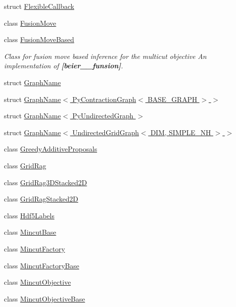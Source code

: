 \begin{DoxyCompactItemize}
\item 
struct \hyperlink{structnifty_1_1graph_1_1FlexibleCallback}{Flexible\+Callback}
\item 
class \hyperlink{classnifty_1_1graph_1_1FusionMove}{Fusion\+Move}
\item 
class \hyperlink{classnifty_1_1graph_1_1FusionMoveBased}{Fusion\+Move\+Based}
\begin{DoxyCompactList}\small\item\em Class for fusion move based inference for the multicut objective An implementation of {\bfseries [beier\+\_\+\_\+funsion]}. \end{DoxyCompactList}\item 
struct \hyperlink{structnifty_1_1graph_1_1GraphName}{Graph\+Name}
\item 
struct \hyperlink{structnifty_1_1graph_1_1GraphName_3_01PyContractionGraph_3_01BASE__GRAPH_01_4_01_4}{Graph\+Name$<$ Py\+Contraction\+Graph$<$ B\+A\+S\+E\+\_\+\+G\+R\+A\+P\+H $>$ $>$}
\item 
struct \hyperlink{structnifty_1_1graph_1_1GraphName_3_01PyUndirectedGraph_01_4}{Graph\+Name$<$ Py\+Undirected\+Graph $>$}
\item 
struct \hyperlink{structnifty_1_1graph_1_1GraphName_3_01UndirectedGridGraph_3_01DIM_00_01SIMPLE__NH_01_4_01_4}{Graph\+Name$<$ Undirected\+Grid\+Graph$<$ D\+I\+M, S\+I\+M\+P\+L\+E\+\_\+\+N\+H $>$ $>$}
\item 
class \hyperlink{classnifty_1_1graph_1_1GreedyAdditiveProposals}{Greedy\+Additive\+Proposals}
\item 
class \hyperlink{classnifty_1_1graph_1_1GridRag}{Grid\+Rag}
\item 
class \hyperlink{classnifty_1_1graph_1_1GridRag3DStacked2D}{Grid\+Rag3\+D\+Stacked2\+D}
\item 
class \hyperlink{classnifty_1_1graph_1_1GridRagStacked2D}{Grid\+Rag\+Stacked2\+D}
\item 
class \hyperlink{classnifty_1_1graph_1_1Hdf5Labels}{Hdf5\+Labels}
\item 
class \hyperlink{classnifty_1_1graph_1_1MincutBase}{Mincut\+Base}
\item 
class \hyperlink{classnifty_1_1graph_1_1MincutFactory}{Mincut\+Factory}
\item 
class \hyperlink{classnifty_1_1graph_1_1MincutFactoryBase}{Mincut\+Factory\+Base}
\item 
class \hyperlink{classnifty_1_1graph_1_1MincutObjective}{Mincut\+Objective}
\item 
class \hyperlink{classnifty_1_1graph_1_1MincutObjectiveBase}{Mincut\+Objective\+Base}

\end{DoxyCompactItemize}
